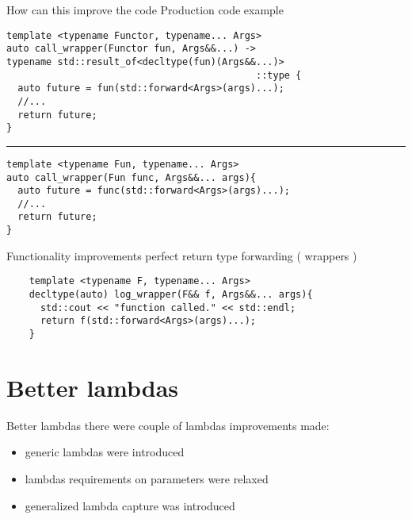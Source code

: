 \documentclass[10pt]{beamer}
\begin{document}
\begin{frame}[fragile]{How can this improve the code}
	\centering Production code example
	\begin{verbatim}
template <typename Functor, typename... Args>
auto call_wrapper(Functor fun, Args&&...) ->
typename std::result_of<decltype(fun)(Args&&...)>
                                            ::type {
  auto future = fun(std::forward<Args>(args)...);
  //...
  return future;
}
	\end{verbatim}

	\pause
	\hrule

\begin{verbatim}
template <typename Fun, typename... Args>
auto call_wrapper(Fun func, Args&&... args){
  auto future = func(std::forward<Args>(args)...);
  //...
  return future;
}
\end{verbatim}
\end{frame}

\begin{frame}[fragile]{Functionality improvements}
\centering 
	perfect return type forwarding ( wrappers ) \\
	\vfill

	\begin{verbatim}
    template <typename F, typename... Args>
    decltype(auto) log_wrapper(F&& f, Args&&... args){
	  std::cout << "function called." << std::endl;
	  return f(std::forward<Args>(args)...);
    }
	\end{verbatim}

\end{frame}

\section{Better lambdas}
\begin{frame}{Better lambdas}
	\centering there were couple of lambdas improvements made:
	\begin{itemize}[<+- |alert@+>]
	\item generic lambdas were introduced
	\item lambdas requirements on parameters were relaxed
	\item generalized lambda capture was introduced
	\end{itemize}
\end{frame}
\end{document}

